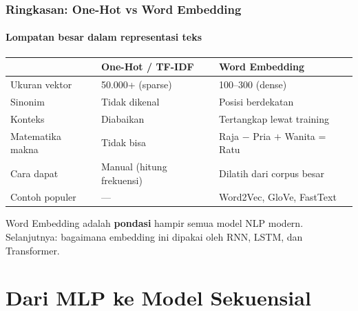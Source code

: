 \documentclass[t,aspectratio=169,xcolor=dvipsnames]{beamer}
\begin{document}
\begin{frame}
    \frametitle{Ringkasan: One-Hot vs Word Embedding}
    \framesubtitle{Lompatan besar dalam representasi teks}
    \small
    \begin{center}
    \setlength{\tabcolsep}{4pt}
    \begin{tabular}{lll}
        \toprule
        & \textbf{One-Hot / TF-IDF} & \textbf{Word Embedding} \\
        \midrule
        Ukuran vektor   & 50.000+ (sparse)           & 100--300 (dense) \\
        Sinonim         & Tidak dikenal               & Posisi berdekatan \\
        Konteks         & Diabaikan                   & Tertangkap lewat training \\
        Matematika makna & Tidak bisa                 & Raja $-$ Pria $+$ Wanita = Ratu \\
        Cara dapat      & Manual (hitung frekuensi)  & Dilatih dari corpus besar \\
        Contoh populer  & ---                         & Word2Vec, GloVe, FastText \\
        \bottomrule
    \end{tabular}
    \end{center}
    \vspace{0.4em}
    \begin{tcolorbox}[colback=nyublue!10, colframe=nyublue, boxrule=0.8mm, arc=2mm, halign=center]
        Word Embedding adalah \textbf{pondasi} hampir semua model NLP modern.\\
        \small Selanjutnya: bagaimana embedding ini dipakai oleh RNN, LSTM, dan Transformer.
    \end{tcolorbox}
\end{frame}

\section{Dari MLP ke Model Sekuensial}
\end{document}

